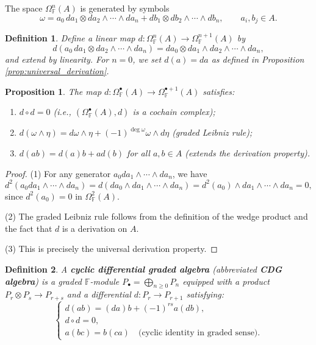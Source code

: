 \documentclass[pdflatex,sn-mathphys-num]{sn-jnl}%
\theoremstyle{thmstyleone}%
\newtheorem{proposition}[theorem]{Proposition}%
\newtheorem{definition}{Definition}[section]
\theoremstyle{thmstyletwo}%
\theoremstyle{thmstylethree}%
\begin{document}
The space $\Omega^n_{\mathbb{F}}(A)$ is generated by symbols
\[
\omega = a_0 \, da_1 \otimes da_2 \wedge \cdots \wedge da_n + db_1 \otimes db_2 \wedge \cdots \wedge db_n, \qquad a_i, b_j \in A.
\]

\begin{definition}\label{def:differential_operator}
Define a linear map $d: \Omega^n_{\mathbb{F}}(A) \to \Omega^{n+1}_{\mathbb{F}}(A)$ by
\[
d(a_0 \, da_1 \otimes da_2 \wedge \cdots \wedge da_n) = da_0 \otimes da_1 \wedge da_2 \wedge \cdots \wedge da_n,
\]
and extend by linearity. For $n = 0$, we set $d(a) = da$ as defined in Proposition \ref{prop:universal_derivation}.
\end{definition}

\begin{proposition}\label{prop:differential_properties}
The map $d: \Omega^\bullet_{\mathbb{F}}(A) \to \Omega^{\bullet+1}_{\mathbb{F}}(A)$ satisfies:
\begin{enumerate}
\item[(1)] $d \circ d = 0$ (i.e., $(\Omega^\bullet_{\mathbb{F}}(A), d)$ is a cochain complex);
\item[(2)] $d(\omega \wedge \eta) = d\omega \wedge \eta + (-1)^{\deg \omega} \omega \wedge d\eta$ (graded Leibniz rule);
\item[(3)] $d(ab) = d(a) b + a d(b)$ for all $a, b \in A$ (extends the derivation property).
\end{enumerate}
\end{proposition}

\begin{proof}
(1) For any generator $a_0 da_1 \wedge \cdots \wedge da_n$, we have
\[
d^2(a_0 da_1 \wedge \cdots \wedge da_n) = d(da_0 \wedge da_1 \wedge \cdots \wedge da_n) = d^2(a_0) \wedge da_1 \wedge \cdots \wedge da_n = 0,
\]
since $d^2(a_0) = 0$ in $\Omega^2_{\mathbb{F}}(A)$.

(2) The graded Leibniz rule follows from the definition of the wedge product and the fact that $d$ is a derivation on $A$.

(3) This is precisely the universal derivation property. 
\end{proof}

\begin{definition}\label{def:cdg_algebra}
A \textbf{cyclic differential graded algebra} (abbreviated \textbf{CDG algebra}) is a graded $\mathbb{F}$-module $P_\bullet = \bigoplus_{n \ge 0} P_n$ equipped with a product $P_r \otimes P_s \to P_{r+s}$ and a differential $d: P_r \to P_{r+1}$ satisfying:
\[
\begin{cases}
d(ab) = (da)b + (-1)^{rs} a(db), \\
d \circ d = 0, \\
a(bc) = b(ca) \quad \text{(cyclic identity in graded sense)}.
\end{cases}
\]
\end{definition}
\end{document}
